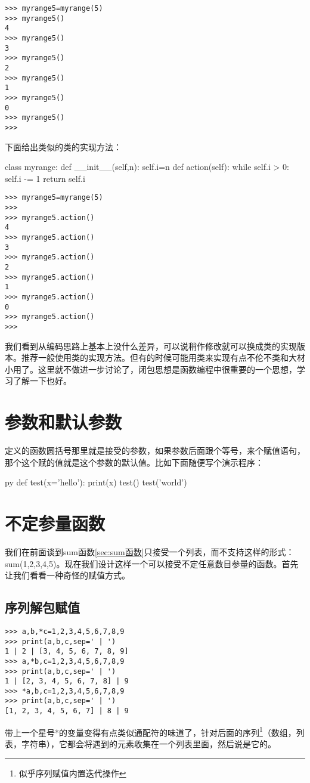 \documentclass[12pt,oneside]{book}
\begin{document}
\begin{common-format}
\begin{Verbatim}
>>> myrange5=myrange(5)
>>> myrange5()
4
>>> myrange5()
3
>>> myrange5()
2
>>> myrange5()
1
>>> myrange5()
0
>>> myrange5()
>>> 
\end{Verbatim}

下面给出类似的类的实现方法：
\begin{tcbpython}
class myrange:
    def __init__(self,n):
        self.i=n
    def action(self):
        while self.i > 0:
            self.i -= 1
            return self.i
\end{tcbpython}
\begin{Verbatim}
>>> myrange5=myrange(5)
>>> 
>>> myrange5.action()
4
>>> myrange5.action()
3
>>> myrange5.action()
2
>>> myrange5.action()
1
>>> myrange5.action()
0
>>> myrange5.action()
>>> 
\end{Verbatim}
我们看到从编码思路上基本上没什么差异，可以说稍作修改就可以换成类的实现版本。推荐一般使用类的实现方法。但有的时候可能用类来实现有点不伦不类和大材小用了。这里就不做进一步讨论了，闭包思想是函数编程中很重要的一个思想，学习了解一下也好。



\section{参数和默认参数}
定义的函数圆括号那里就是接受的参数，如果参数后面跟个等号，来个赋值语句，那个这个赋的值就是这个参数的默认值。比如下面随便写个演示程序：
\begin{xverbatim}[129]{py}
def test(x='hello'):
    print(x)
test()
test('world')
\end{xverbatim}


\section{不定参量函数}
我们在前面谈到sum函数\ref{sec:sum函数}只接受一个列表，而不支持这样的形式：sum(1,2,3,4,5)。现在我们设计这样一个可以接受不定任意数目参量的函数。首先让我们看看一种奇怪的赋值方式。

\subsection{序列解包赋值}
\label{sec:序列解包赋值}
\begin{Verbatim}
>>> a,b,*c=1,2,3,4,5,6,7,8,9
>>> print(a,b,c,sep=' | ')
1 | 2 | [3, 4, 5, 6, 7, 8, 9]
>>> a,*b,c=1,2,3,4,5,6,7,8,9
>>> print(a,b,c,sep=' | ')
1 | [2, 3, 4, 5, 6, 7, 8] | 9
>>> *a,b,c=1,2,3,4,5,6,7,8,9
>>> print(a,b,c,sep=' | ')
[1, 2, 3, 4, 5, 6, 7] | 8 | 9
\end{Verbatim}
带上一个星号*的变量变得有点类似通配符的味道了，针对后面的序列\footnote{似乎序列赋值内置迭代操作}（数组，列表，字符串），它都会将遇到的元素收集在一个列表里面，然后说是它的。


\end{common-format}
\end{document}
